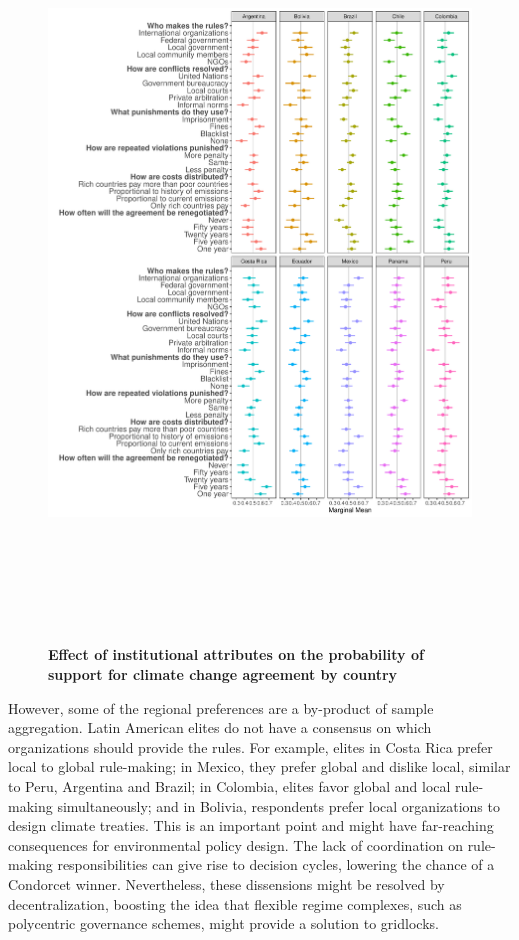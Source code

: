 \documentclass[a4paper,12pt]{article}
\begin{document}
\begin{figure}[H]
	\centering
	\includegraphics[width=\linewidth, height=20cm]{MM_country.pdf}
	\caption{\textbf{Effect of institutional attributes on the probability of support for climate change agreement by country}}
	\label{fig:countries}
\end{figure}

However, some of the regional preferences are a by-product of sample aggregation. Latin American elites do not have a consensus on which organizations should provide the rules. For example, elites in Costa Rica prefer local to global rule-making; in Mexico, they prefer global and dislike local, similar to Peru, Argentina and Brazil; in Colombia, elites favor global and local rule-making simultaneously; and in Bolivia, respondents prefer local organizations to design climate treaties. This is an important point and might have far-reaching consequences for environmental policy design. The lack of coordination on rule-making responsibilities can give rise to decision cycles, lowering the chance of a Condorcet winner. Nevertheless, these dissensions might be resolved by decentralization, boosting the idea that flexible regime complexes, such as polycentric governance schemes, might provide a solution to gridlocks.
\end{document}
